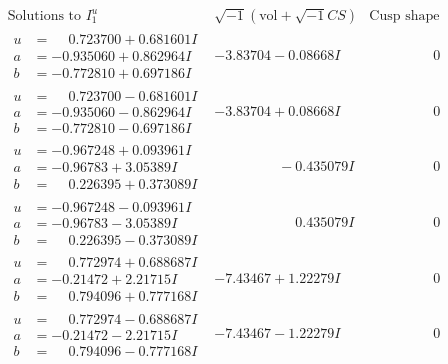 \documentclass[1p]{elsarticle_modified}
\theoremstyle{definition}
\newcommand{\I}{\sqrt{-1}}
\begin{document}
$$\begin{array}{c|c|c}  
\text{Solutions to }I^u_{1}& \I (\text{vol} + \sqrt{-1}CS) & \text{Cusp shape}\\
 \hline 
\begin{aligned}
u &= \phantom{-}0.723700 + 0.681601 I \\
a &= -0.935060 + 0.862964 I \\
b &= -0.772810 + 0.697186 I\end{aligned}
 & -3.83704 - 0.08668 I & \phantom{-0.000000 } 0 \\ \hline\begin{aligned}
u &= \phantom{-}0.723700 - 0.681601 I \\
a &= -0.935060 - 0.862964 I \\
b &= -0.772810 - 0.697186 I\end{aligned}
 & -3.83704 + 0.08668 I & \phantom{-0.000000 } 0 \\ \hline\begin{aligned}
u &= -0.967248 + 0.093961 I \\
a &= -0.96783 + 3.05389 I \\
b &= \phantom{-}0.226395 + 0.373089 I\end{aligned}
 & \phantom{-0.000000 } -0.435079 I & \phantom{-0.000000 } 0 \\ \hline\begin{aligned}
u &= -0.967248 - 0.093961 I \\
a &= -0.96783 - 3.05389 I \\
b &= \phantom{-}0.226395 - 0.373089 I\end{aligned}
 & \phantom{-0.000000 -}0.435079 I & \phantom{-0.000000 } 0 \\ \hline\begin{aligned}
u &= \phantom{-}0.772974 + 0.688687 I \\
a &= -0.21472 + 2.21715 I \\
b &= \phantom{-}0.794096 + 0.777168 I\end{aligned}
 & -7.43467 + 1.22279 I & \phantom{-0.000000 } 0 \\ \hline\begin{aligned}
u &= \phantom{-}0.772974 - 0.688687 I \\
a &= -0.21472 - 2.21715 I \\
b &= \phantom{-}0.794096 - 0.777168 I\end{aligned}
 & -7.43467 - 1.22279 I & \phantom{-0.000000 } 0 \\ \hline\begin{aligned}

\end{aligned}
\end{array}$$
\end{document}
